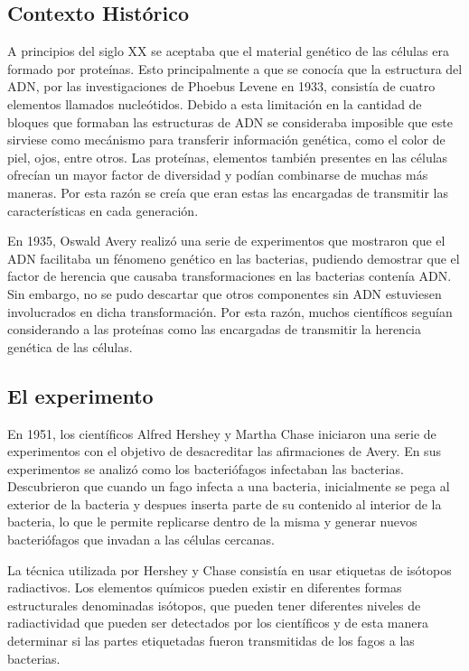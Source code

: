 \documentclass[journal]{IEEEtran}
\begin{document}
\subsection{Contexto Histórico}

A principios del siglo XX se aceptaba que el material genético de las células
era formado por proteínas. Esto principalmente a que se conocía que la estructura 
del ADN, por las investigaciones de Phoebus Levene en 1933, consistía de cuatro elementos llamados
nucleótidos.
Debido a esta limitación en la cantidad de bloques que formaban las estructuras de ADN se consideraba
imposible que este sirviese como mecánismo para transferir información genética, como el color de piel, ojos, entre otros.
Las proteínas, elementos también presentes en las células ofrecían un mayor factor de diversidad y podían combinarse de muchas más maneras. Por esta
razón se creía que eran estas las encargadas de transmitir las características en cada generación.

En 1935, Oswald Avery realizó una serie de experimentos que mostraron que el ADN facilitaba un fénomeno genético en las bacterias, pudiendo demostrar que el factor de herencia 
que causaba transformaciones en las bacterias contenía ADN. Sin embargo, no se pudo descartar que otros componentes sin ADN estuviesen involucrados en dicha transformación.
Por esta razón, muchos científicos seguían considerando a las proteínas como las encargadas de transmitir la herencia genética de las células.

\subsection{El experimento}
En 1951, los científicos Alfred Hershey y Martha Chase iniciaron una serie de experimentos con el objetivo de desacreditar
las afirmaciones de Avery. En sus experimentos se analizó como los bacteriófagos infectaban las bacterias.
Descubrieron que cuando un fago infecta a una bacteria, inicialmente se pega al exterior de la bacteria y despues inserta parte de su contenido 
al interior de la bacteria, lo que le permite replicarse dentro de la misma y generar nuevos bacteriófagos que invadan a las células cercanas.

La técnica utilizada por Hershey y Chase consistía en usar etiquetas de isótopos radiactivos.
Los elementos químicos pueden existir en diferentes formas estructurales denominadas isótopos, que pueden 
tener diferentes niveles de radiactividad que pueden ser detectados por los científicos y de esta manera determinar si las partes etiquetadas fueron transmitidas de los fagos a las bacterias.
\end{document}
